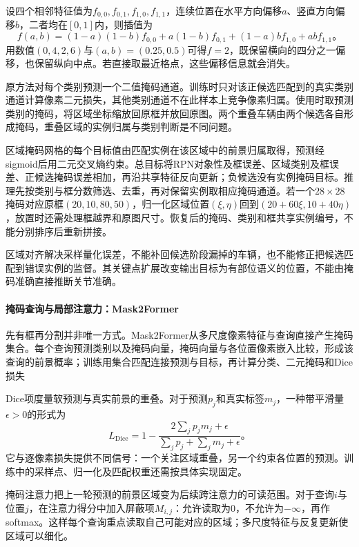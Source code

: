 设四个相邻特征值为$f_{0,0},f_{0,1},f_{1,0},f_{1,1}$，连续位置在水平方向偏移$a$、竖直方向偏移$b$，二者均在$[0,1]$内，则插值为
\begin{equation}
 f(a,b)=(1-a)(1-b)f_{0,0}
 +a(1-b)f_{0,1}+(1-a)bf_{1,0}+abf_{1,1}\text{。}
 \label{eq:vision-roialign}
\end{equation}
用数值$(0,4,2,6)$与$(a,b)=(0.25,0.5)$可得$f=2$，既保留横向的四分之一偏移，也保留纵向中点。若直接取最近格点，这些偏移信息就会消失。

原方法对每个类别预测一个二值掩码通道。训练时只对该正候选匹配到的真实类别通道计算像素二元损失，其他类别通道不在此样本上竞争像素归属。使用时取预测类别的掩码，将区域坐标缩放回原框并放回原图。两个重叠车辆由两个候选各自形成掩码，重叠区域的实例归属与类别判断是不同问题。

区域掩码网格的每个目标值由匹配实例在该区域中的前景归属取得，预测经sigmoid后用二元交叉熵约束。总目标将RPN对象性及框误差、区域类别及框误差、正候选掩码误差相加，再沿共享特征反向更新；负候选没有实例掩码目标。推理先按类别与框分数筛选、去重，再对保留实例取相应掩码通道。若一个$28\times28$掩码对应原框$(20,10,80,50)$，归一化区域位置$(\xi,\eta)$回到$(20+60\xi,10+40\eta)$，放置时还需处理框越界和原图尺寸。恢复后的掩码、类别和框共享实例编号，不能分别排序后重新拼接。

区域对齐解决采样量化误差，不能补回候选阶段漏掉的车辆，也不能修正把候选匹配到错误实例的监督。其关键点扩展改变输出目标为有部位语义的位置，不能由掩码准确直接推断关节准确。

\paragraph{掩码查询与局部注意力：Mask2Former}
\label{sec:vision-recognition-mask2former}

先有框再分割并非唯一方式。Mask2Former从多尺度像素特征与查询直接产生掩码集合。每个查询预测类别以及掩码向量，掩码向量与各位置像素嵌入比较，形成该查询的前景概率；训练用集合匹配连接预测与目标，再计算分类、二元掩码和Dice损失

Dice项度量软预测与真实前景的重叠。对于预测$p_j$和真实标签$m_j$，一种带平滑量$\epsilon>0$的形式为
\begin{equation}
 L_{\mathrm{Dice}}=
 1-\frac{2\sum_j p_jm_j+\epsilon}
 {\sum_j p_j+\sum_j m_j+\epsilon}\text{。}
 \label{eq:vision-dice}
\end{equation}
它与逐像素损失提供不同信号：一个关注区域重叠，另一个约束各位置的预测。训练中的采样点、归一化及匹配权重还需按具体实现固定。

掩码注意力把上一轮预测的前景区域变为后续跨注意力的可读范围。对于查询$i$与位置$j$，在注意力得分中加入屏蔽项$M_{i,j}$：允许读取为0，不允许为$-\infty$，再作softmax。这样每个查询重点读取自己可能对应的区域；多尺度特征与反复更新使区域可以细化。


